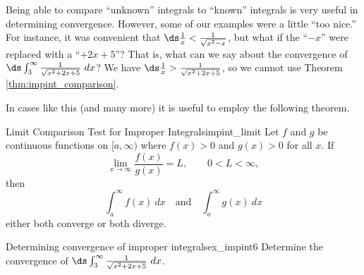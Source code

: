 Being able to compare ``unknown'' integrals to ``known'' integrals is very useful in determining convergence. However, some of our examples were a little ``too nice.'' For instance, it was convenient that $\ds \frac{1}x < \frac{1}{\sqrt{x^2-x}}$, but what if the ``$-x$'' were replaced with a ``$+2x+5$''? That is, what can we say about the convergence of $\ds \int_3^\infty\frac{1}{\sqrt{x^2+2x+5}}\ dx$? We have $\ds \frac{1}{x} > \frac1{\sqrt{x^2+2x+5}}$, so we cannot use Theorem \ref{thm:impint_comparison}.

In cases like this (and many more) it is useful to employ the following theorem.
%

\begin{theorem}{Limit Comparison Test for Improper Integrals}{impint_limit}
{
		Let $f$ and $g$ be continuous functions on $[a,\infty)$ where $f(x)>0$ and $g(x)>0$ for all $x$. If $$\lim_{x\to\infty} \frac{f(x)}{g(x)} = L,\qquad 0<L<\infty,$$
	then $$\int_a^\infty f(x)\ dx \quad \text{and} \quad \int_a^\infty g(x)\ dx$$ either both converge or both diverge.%
}
\end{theorem}

\begin{example}{Determining convergence of improper integrals}{ex_impint6}
{
Determine the convergence of $\ds \int_3^{\infty} \frac{1}{\sqrt{x^2+2x+5}}\ dx$.
}
\end{example}


